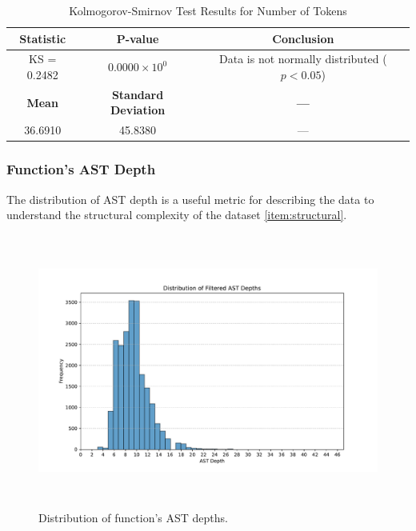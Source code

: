 \documentclass[10pt,english,a4paper]{report}
\begin{document}
\begin{table}[h!]
    \centering
    \caption{Kolmogorov-Smirnov Test Results for Number of Tokens}
    \label{tab:kolmogorov_smirnov_tokens}
    \begin{tabular}{|c|c|c|}
        \hline
        \textbf{Statistic} & \textbf{P-value} & \textbf{Conclusion} \\
        \hline
        KS = 0.2482 & $0.0000 \times 10^{0}$ & Data is not normally distributed ($p < 0.05$) \\
        \hline
        \textbf{Mean} & \textbf{Standard Deviation} & \textbf{---} \\
        \hline
        36.6910 & 45.8380 & --- \\
        \hline
    \end{tabular}
\end{table}

\subsubsection{Function's AST Depth}

The distribution of AST depth is a useful metric for describing the data
to understand the structural complexity of the dataset \ref{item:structural}.

\begin{figure}[H]
    \centering
    \includegraphics[width=16cm, height=9cm]{figures/ast_depths_merged.pdf} 
    \caption{Distribution of function's AST depths.}
    \label{fig:func_lengths_distr_merged}
\end{figure}
\end{document}
